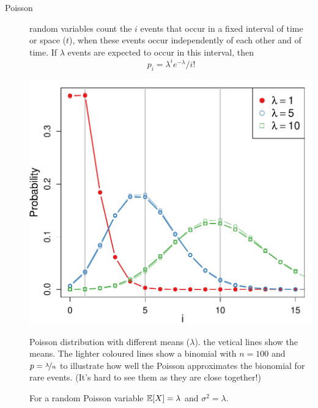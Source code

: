 \begin{description}
\item[Poisson] random variables count the $i$ events that occur in a
  fixed interval of time or space ($t$), when these events occur independently of
  each other and of time. If $\lambda$ events are
  expected to occur in this interval, then
 \begin{equation}
p_i = \lambda^i e^{-\lambda}/i!
\end{equation}
    \begin{marginfigure}
 \begin{center}
   \includegraphics[width=\textwidth]{math_background/dist_pics/Poisson.pdf}\end{center}
 \caption{Poisson distribution with different means ($\lambda$). the
   vetical lines show the means. The lighter coloured lines show a
   binomial with $n=100$ and $p=\nicefrac{\lambda}{n}$ to illustrate
   how well the Poisson approximates the bionomial for rare events.
   (It's hard to see them as they are close together!) 
   }\label{Fig:poisson}
 \end{marginfigure}
 For a random Poisson variable $\mathbb{E}[X]=\lambda$ and $\sigma^2 =
 \lambda$. 


\end{description}
